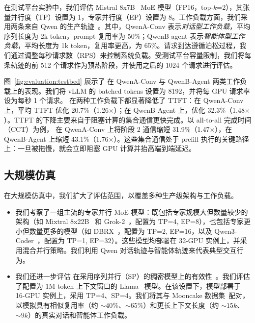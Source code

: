 在测试平台实验中，我们评估 Mistral 8x7B~\cite{mixtral7b} MoE 模型（FP16，top-$k$=2），其张量并行度（TP）设置为 1，专家并行度（EP）设置为 8。工作负载方面，我们采用两条来自 Qwen 的生产轨迹~\cite{qwen_bailian_traces}。其中，QwenA-Conv 表示\textit{对话型工作负载}，平均序列长度为 2k token，prompt 复用率为 50\%；QwenB-agent 表示\textit{智能体型工作负载}，平均长度为 1k token，复用率更高，为 65\%。请求到达遵循泊松过程，我们通过调整每秒请求数（RPS）来控制系统负载。受测试平台容量限制，我们将每条轨迹的前 512 个请求作为预热阶段，并使用之后的 1024 个请求进行评估。

图~\ref{fig:evaluation:testbed} 展示了 \sys{} 在 QwenA-Conv 与 QwenB-Agent 两类工作负载上的表现。我们将 vLLM 的 batched tokens 设置为 8192，并将每 GPU 请求率设为每秒 1 个请求。\sys{} 在两种工作负载下都显著降低了 TTFT：在 QwenA-Conv 上，平均 TTFT 优化 20.7\%（1.26$\times$）；在 QwenB-Agent 上，优化 32.3\%（1.48$\times$）。TTFT 的下降主要来自于阻塞计算的集合通信更快完成。以 all-to-all 完成时间（CCT）为例，\sys{} 在 QwenA-Conv 上将阶段 2 通信缩短 31.9\%（1.47$\times$），在 QwenB-Agent 上缩短 43.1\%（1.76$\times$）。这些集合通信处于 prefill 执行的关键路径上：一旦被拖慢，就会立即阻塞 GPU 计算并抬高端到端延迟。

\subsection{大规模仿真}

在大规模仿真中，我们扩大了评估范围，以覆盖多种生产级架构与工作负载。
\begin{itemize}[leftmargin=*]
    \item 我们考察了一组主流的专家并行 MoE 模型：既包括专家规模大但数量较少的架构（如 Mixtral 8x22B~\cite{mixtral22b} 和 Grok-2~\cite{grok}，配置为 TP=4, EP=8），也包括专家更小但数量更多的模型（如 DBRX~\cite{dbrx}，配置为 TP=2, EP=16，以及 Qwen3-Coder~\cite{qwen-coder}，配置为 TP=1, EP=32）。这些模型均部署在 32-GPU 实例上，并采用混合并行策略。我们利用 Qwen 对话轨迹与智能体轨迹来代表典型交互行为。
    \item 我们还进一步评估 \sys{} 在采用序列并行（SP）的稠密模型上的有效性~\cite{ringattention}。我们评估了配置为 1M token 上下文窗口的 Llama~\cite{llama} 模型。在该设置下，模型部署于 16-GPU 实例上，采用 TP=4、SP=4。我们将其与 Mooncake 数据集~\cite{mooncake}配对，以模拟具有相似复用率（约 $\sim40\%$、$\sim65\%$）和更长上下文长度（约 $\sim15k$、$\sim9k$）的真实对话和智能体工作负载。
\end{itemize}

